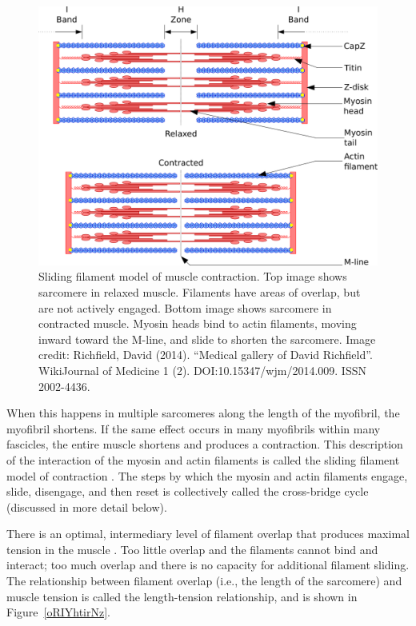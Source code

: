 \documentclass{article}
\begin{document}
\begin{figure}[!htbp]
\centering
\includegraphics[width=0.9\linewidth]{files/EPpXta8zJdzN048lz8AR-8ad46c971a35488e5309e40a0170b303.pdf}
\caption[]{Sliding filament model of muscle contraction. Top image shows sarcomere in relaxed muscle. Filaments have areas of overlap, but are not actively engaged. Bottom image shows sarcomere in contracted muscle. Myosin heads bind to actin filaments, moving inward toward the M-line, and slide to shorten the sarcomere. Image credit: Richfield, David (2014). ``Medical gallery of David Richfield''. WikiJournal of Medicine 1 (2). DOI:10.15347/wjm/2014.009. ISSN 2002-4436.}
\label{JNosxs7VQf}
\end{figure}

When this happens in multiple sarcomeres along the length of the myofibril, the myofibril shortens. If the same effect occurs in many myofibrils within many fascicles, the entire muscle shortens and produces a contraction. This description of the interaction of the myosin and actin filaments is called the sliding filament model of contraction \citep{openStax_contraction, guyton2016book}. The steps by which the myosin and actin filaments engage, slide, disengage, and then reset is collectively called the cross-bridge cycle (discussed in more detail below).

There is an optimal, intermediary level of filament overlap that produces maximal tension in the muscle \citep{guyton2016book, openStax_neuro}. Too little overlap and the filaments cannot bind and interact; too much overlap and there is no capacity for additional filament sliding. The relationship between filament overlap (i.e., the length of the sarcomere) and muscle tension is called the length-tension relationship, and is shown in Figure~\ref{oRIYhtirNz}.
\end{document}
